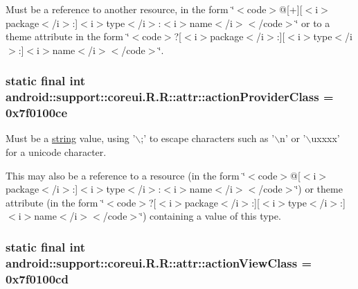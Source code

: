 Must be a reference to another resource, in the form \char`\"{}$<$code$>$@\mbox{[}+\mbox{]}\mbox{[}$<$i$>$package$<$/i$>$:\mbox{]}$<$i$>$type$<$/i$>$:$<$i$>$name$<$/i$>$$<$/code$>$\char`\"{} or to a theme attribute in the form \char`\"{}$<$code$>$?\mbox{[}$<$i$>$package$<$/i$>$:\mbox{]}\mbox{[}$<$i$>$type$<$/i$>$:\mbox{]}$<$i$>$name$<$/i$>$$<$/code$>$\char`\"{}. \hypertarget{classandroid_1_1support_1_1coreui_1_1_r_1_1attr_f93a043d48e48207b87673af504980f6}{
\subsubsection[{actionProviderClass}]{\setlength{\rightskip}{0pt plus 5cm}static final int android::support::coreui.R.R::attr::actionProviderClass = 0x7f0100ce}}
\label{classandroid_1_1support_1_1coreui_1_1_r_1_1attr_f93a043d48e48207b87673af504980f6}


Must be a \hyperlink{classandroid_1_1support_1_1coreui_1_1_r_1_1string}{string} value, using '$\backslash$;' to escape characters such as '$\backslash$n' or '$\backslash$uxxxx' for a unicode character. 

This may also be a reference to a resource (in the form \char`\"{}$<$code$>$@\mbox{[}$<$i$>$package$<$/i$>$:\mbox{]}$<$i$>$type$<$/i$>$:$<$i$>$name$<$/i$>$$<$/code$>$\char`\"{}) or theme attribute (in the form \char`\"{}$<$code$>$?\mbox{[}$<$i$>$package$<$/i$>$:\mbox{]}\mbox{[}$<$i$>$type$<$/i$>$:\mbox{]}$<$i$>$name$<$/i$>$$<$/code$>$\char`\"{}) containing a value of this type. \hypertarget{classandroid_1_1support_1_1coreui_1_1_r_1_1attr_bd2489d2b2c5000919f28128cff75972}{
\subsubsection[{actionViewClass}]{\setlength{\rightskip}{0pt plus 5cm}static final int android::support::coreui.R.R::attr::actionViewClass = 0x7f0100cd}}
\label{classandroid_1_1support_1_1coreui_1_1_r_1_1attr_bd2489d2b2c5000919f28128cff75972}


